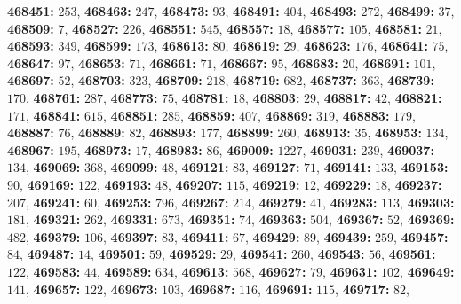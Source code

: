 \textsf{\bfseries 468451:} $253$, \textsf{\bfseries 468463:} $247$, \textsf{\bfseries 468473:} $93$, \textsf{\bfseries 468491:} $404$, \textsf{\bfseries 468493:} $272$, \textsf{\bfseries 468499:} $37$, \textsf{\bfseries 468509:} $7$, \textsf{\bfseries 468527:} $226$, \textsf{\bfseries 468551:} $545$, \textsf{\bfseries 468557:} $18$, \textsf{\bfseries 468577:} $105$, \textsf{\bfseries 468581:} $21$, \textsf{\bfseries 468593:} $349$, \textsf{\bfseries 468599:} $173$, \textsf{\bfseries 468613:} $80$, \textsf{\bfseries 468619:} $29$, \textsf{\bfseries 468623:} $176$, \textsf{\bfseries 468641:} $75$, \textsf{\bfseries 468647:} $97$, \textsf{\bfseries 468653:} $71$, \textsf{\bfseries 468661:} $71$, \textsf{\bfseries 468667:} $95$, \textsf{\bfseries 468683:} $20$, \textsf{\bfseries 468691:} $101$, \textsf{\bfseries 468697:} $52$, \textsf{\bfseries 468703:} $323$, \textsf{\bfseries 468709:} $218$, \textsf{\bfseries 468719:} $682$, \textsf{\bfseries 468737:} $363$, \textsf{\bfseries 468739:} $170$, \textsf{\bfseries 468761:} $287$, \textsf{\bfseries 468773:} $75$, \textsf{\bfseries 468781:} $18$, \textsf{\bfseries 468803:} $29$, \textsf{\bfseries 468817:} $42$, \textsf{\bfseries 468821:} $171$, \textsf{\bfseries 468841:} $615$, \textsf{\bfseries 468851:} $285$, \textsf{\bfseries 468859:} $407$, \textsf{\bfseries 468869:} $319$, \textsf{\bfseries 468883:} $179$, \textsf{\bfseries 468887:} $76$, \textsf{\bfseries 468889:} $82$, \textsf{\bfseries 468893:} $177$, \textsf{\bfseries 468899:} $260$, \textsf{\bfseries 468913:} $35$, \textsf{\bfseries 468953:} $134$, \textsf{\bfseries 468967:} $195$, \textsf{\bfseries 468973:} $17$, \textsf{\bfseries 468983:} $86$, \textsf{\bfseries 469009:} $1227$, \textsf{\bfseries 469031:} $239$, \textsf{\bfseries 469037:} $134$, \textsf{\bfseries 469069:} $368$, \textsf{\bfseries 469099:} $48$, \textsf{\bfseries 469121:} $83$, \textsf{\bfseries 469127:} $71$, \textsf{\bfseries 469141:} $133$, \textsf{\bfseries 469153:} $90$, \textsf{\bfseries 469169:} $122$, \textsf{\bfseries 469193:} $48$, \textsf{\bfseries 469207:} $115$, \textsf{\bfseries 469219:} $12$, \textsf{\bfseries 469229:} $18$, \textsf{\bfseries 469237:} $207$, \textsf{\bfseries 469241:} $60$, \textsf{\bfseries 469253:} $796$, \textsf{\bfseries 469267:} $214$, \textsf{\bfseries 469279:} $41$, \textsf{\bfseries 469283:} $113$, \textsf{\bfseries 469303:} $181$, \textsf{\bfseries 469321:} $262$, \textsf{\bfseries 469331:} $673$, \textsf{\bfseries 469351:} $74$, \textsf{\bfseries 469363:} $504$, \textsf{\bfseries 469367:} $52$, \textsf{\bfseries 469369:} $482$, \textsf{\bfseries 469379:} $106$, \textsf{\bfseries 469397:} $83$, \textsf{\bfseries 469411:} $67$, \textsf{\bfseries 469429:} $89$, \textsf{\bfseries 469439:} $259$, \textsf{\bfseries 469457:} $84$, \textsf{\bfseries 469487:} $14$, \textsf{\bfseries 469501:} $59$, \textsf{\bfseries 469529:} $29$, \textsf{\bfseries 469541:} $260$, \textsf{\bfseries 469543:} $56$, \textsf{\bfseries 469561:} $122$, \textsf{\bfseries 469583:} $44$, \textsf{\bfseries 469589:} $634$, \textsf{\bfseries 469613:} $568$, \textsf{\bfseries 469627:} $79$, \textsf{\bfseries 469631:} $102$, \textsf{\bfseries 469649:} $141$, \textsf{\bfseries 469657:} $122$, \textsf{\bfseries 469673:} $103$, \textsf{\bfseries 469687:} $116$, \textsf{\bfseries 469691:} $115$, \textsf{\bfseries 469717:} $82$, 
